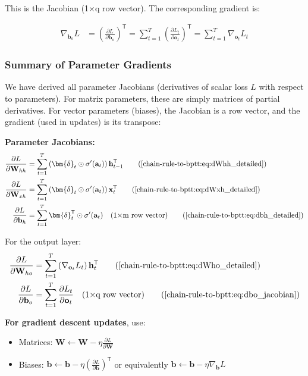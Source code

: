 \begin{notechapter}
This is the Jacobian (1×q row vector). The corresponding gradient is:

\begin{align}
\nabla_{\mathbf{b}_o} L &= \left(\frac{\partial L}{\partial 
\mathbf{b}_o}\right)^\mathsf{T} = \sum_{t=1}^{T} \left(\frac{\partial L_t}{\partial 
\mathbf{o}_t}\right)^\mathsf{T}
    = \sum_{t=1}^{T} \nabla_{\mathbf{o}_t} L_t \label{chain-rule-to-bptt:eq:dbo_gradient}
\end{align}

\subsubsection{Summary of Parameter Gradients}

We have derived all parameter Jacobians (derivatives of scalar loss $L$ with
respect to parameters). For matrix parameters, these are simply matrices of
partial derivatives. For vector parameters (biases), the Jacobian is a row
vector, and the gradient (used in updates) is its transpose:

\textbf{Parameter Jacobians:}
\begin{align}
    \frac{\partial L}{\partial \mathbf{W}_{hh}} &= \sum_{t=1}^{T} 
    \left( \bm{\delta}_t \odot \sigma'(\mathbf{a}_t) \right)
    \mathbf{h}_{t-1}^\mathsf{T} \tag{\ref{chain-rule-to-bptt:eq:dWhh_detailed}} \\
    \frac{\partial L}{\partial \mathbf{W}_{xh}} &= 
    \sum_{t=1}^{T} \left( \bm{\delta}_t \odot \sigma'(\mathbf{a}_t) \right)
    \mathbf{x}_t^\mathsf{T} \tag{\ref{chain-rule-to-bptt:eq:dWxh_detailed}} \\
    \frac{\partial L}{\partial \mathbf{b}_h} &= \sum_{t=1}^{T}
    \bm{\delta}_t^\mathsf{T} \odot \sigma'(\mathbf{a}_t) \quad \text{(1×m row vector)}
    \tag{\ref{chain-rule-to-bptt:eq:dbh_detailed}}
\end{align}

For the output layer:
\begin{align}
    \frac{\partial L}{\partial \mathbf{W}_{ho}} &=
    \sum_{t=1}^{T} \left(\nabla_{\mathbf{o}_t} L_t\right)
    \mathbf{h}_t^\mathsf{T} \tag{\ref{chain-rule-to-bptt:eq:dWho_detailed}} \\
    \frac{\partial L}{\partial \mathbf{b}_o} &=
    \sum_{t=1}^{T} \frac{\partial L_t}{\partial \mathbf{o}_t}
    \quad \text{(1×q row vector)} \tag{\ref{chain-rule-to-bptt:eq:dbo_jacobian}}
\end{align}

\textbf{For gradient descent updates}, use:
\begin{itemize}[itemsep=0pt]
    \item Matrices: $\mathbf{W} \leftarrow \mathbf{W} -
    \eta \frac{\partial L}{\partial \mathbf{W}}$
    \item Biases: $\mathbf{b} \leftarrow \mathbf{b} -
    \eta \left(\frac{\partial L}{\partial \mathbf{b}}\right)^\mathsf{T}$
    or equivalently $\mathbf{b} \leftarrow \mathbf{b} -
    \eta \nabla_{\mathbf{b}} L$
\end{itemize}


\end{notechapter}
